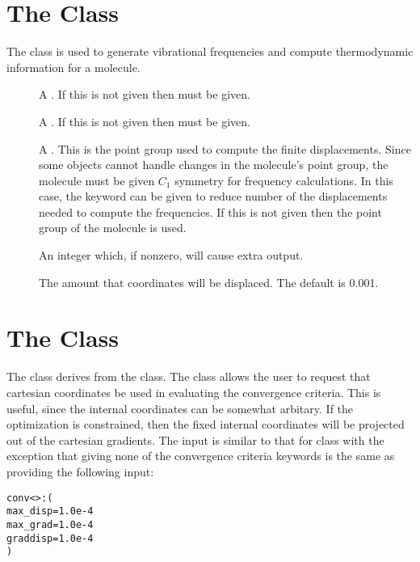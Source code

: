 \section{The  Class}\label{MolecularFrequencies}

The  class is used to generate vibrational
frequencies and compute thermodynamic information for a molecule.

\begin{description}
  \item[] A 
    .  If this is not given then
     must be given.

  \item[] A 
    .  If this is not given then 
    must be given.

  \item[] A 
    .  This is the point group used to compute
    the finite displacements.  Since some  objects
    cannot handle changes in the molecule's point group, the molecule must
    be given $C_1$ symmetry for frequency calculations.  In this case, the
     keyword can be given to reduce number of the
    displacements needed to compute the frequencies.  If this is not given
    then the point group of the molecule is used.

  \item[] An integer which, if nonzero, will cause extra
    output.

  \item[] The amount that coordinates will be
    displaced.  The default is 0.001.

\end{description}


\section{The  Class}\label{MolEnergyConvergence}

The  class derives from the
 class.  The  class
allows the user to request that cartesian coordinates be used in evaluating
the convergence criteria.  This is useful, since the internal coordinates
can be somewhat arbitary.  If the optimization is constrained, then the
fixed internal coordinates will be projected out of the cartesian
gradients.  The input is similar to that for  class
with the exception that giving none of the convergence criteria keywords is
the same as providing the following input:
\begin{alltt}
  conv<>: (
    max_disp = 1.0e-4
    max_grad = 1.0e-4
    graddisp = 1.0e-4
  )
\end{alltt}

